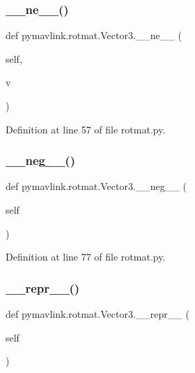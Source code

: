 \subsubsection{\texorpdfstring{\_\_ne\_\_()}{\_\_ne\_\_()}}
{\footnotesize\ttfamily def pymavlink.\+rotmat.\+Vector3.\+\_\+\+\_\+ne\+\_\+\+\_\+ (\begin{DoxyParamCaption}\item[{}]{self,  }\item[{}]{v }\end{DoxyParamCaption})}



Definition at line 57 of file rotmat.\+py.

\mbox{\label{classpymavlink_1_1rotmat_1_1Vector3_a60f4bb01932c3042a90c4e5b6989d743}} 
\subsubsection{\texorpdfstring{\_\_neg\_\_()}{\_\_neg\_\_()}}
{\footnotesize\ttfamily def pymavlink.\+rotmat.\+Vector3.\+\_\+\+\_\+neg\+\_\+\+\_\+ (\begin{DoxyParamCaption}\item[{}]{self }\end{DoxyParamCaption})}



Definition at line 77 of file rotmat.\+py.

\mbox{\label{classpymavlink_1_1rotmat_1_1Vector3_a6f512d3cc5cd1386aea176e7f6ee6bc0}} 
\subsubsection{\texorpdfstring{\_\_repr\_\_()}{\_\_repr\_\_()}}
{\footnotesize\ttfamily def pymavlink.\+rotmat.\+Vector3.\+\_\+\+\_\+repr\+\_\+\+\_\+ (\begin{DoxyParamCaption}\item[{}]{self }\end{DoxyParamCaption})}




